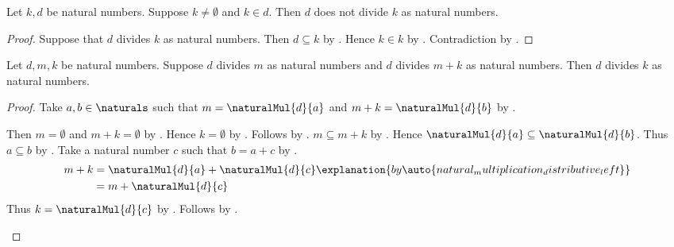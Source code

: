 \begin{proposition}\label{larger_natural_does_not_divide_positive_smaller}
    Let $k,d$ be natural numbers.
    Suppose $k\neq\emptyset$ and $k\in d$.
    Then $d$ does not divide $k$ as natural numbers.
\end{proposition}
\begin{proof}
    Suppose that $d$ divides $k$ as natural numbers.
    Then $d\subseteq k$ by
        .
    Hence $k\in k$ by .
    Contradiction by .
\end{proof}

\begin{theorem}\label{common_divisor_of_sum_difference}
    Let $d,m,k$ be natural numbers.
    Suppose $d$ divides $m$ as natural numbers and
        $d$ divides $m+k$ as natural numbers.
    Then $d$ divides $k$ as natural numbers.
\end{theorem}
\begin{proof}
    Take $a,b\in\naturals$ such that
        $m=\naturalMul{d}{a}$ and
        $m+k=\naturalMul{d}{b}$
        by .
    \begin{byCase}
            Then $m=\emptyset$ and $m+k=\emptyset$
                by .
            Hence $k=\emptyset$ by .
            Follows by .
            $m\subseteq m+k$ by
                .
            Hence $\naturalMul{d}{a}\subseteq\naturalMul{d}{b}$.
            Thus $a\subseteq b$
                by .
            Take a natural number $c$ such that $b=a+c$
                by .
            \begin{align*}
                m+k
                    &= \naturalMul{d}{a}+\naturalMul{d}{c}
                        \explanation{by
                            \auto{natural_multiplication_distributive_left}}
                    \\
                    &= m+\naturalMul{d}{c}
            \end{align*}
            Thus $k=\naturalMul{d}{c}$
                by .
            Follows by .
    \end{byCase}
\end{proof}

